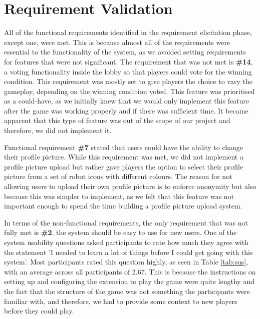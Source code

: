 \documentclass{l4proj}
\begin{document}
\section{Requirement Validation}
All of the functional requirements identified in the requirement elicitation phase, except one, were met. This is because almost all of the requirements were essential to the functionality of the system, as we avoided setting requirements for features that were not significant. The requirement that was not met is \textbf{\#14}, a voting functionality inside the lobby so that players could vote for the winning condition. This requirement was mostly set to give players the choice to vary the gameplay, depending on the winning condition voted. This feature was prioritised as a could-have, as we initially knew that we would only implement this feature after the game was working properly and if there was sufficient time. It became apparent that this type of feature was out of the scope of our project and therefore, we did not implement it. 

Functional requirement \textbf{\#7} stated that users could have the ability to change their profile picture. While this requirement was met, we did not implement a profile picture upload but rather gave players the option to select their profile picture from a set of robot icons with different colours. The reason for not allowing users to upload their own profile picture is to enforce anonymity but also because this was simpler to implement, as we felt that this feature was not important enough to spend the time building a profile picture upload system.

In terms of the non-functional requirements, the only requirement that was not fully met is \textbf{\#2}, the system should be easy to use for new users. One of the system usability questions asked participants to rate how much they agree with the statement 'I needed to learn a lot of things before I could get going with this system'. Most participants rated this question highly, as seen in Table \ref{tab:sus}, with an average across all participants of 2.67. This is because the instructions on setting up and configuring the extension to play the game were quite lengthy and the fact that the structure of the game was not something the participants were familiar with, and therefore, we had to provide some context to new players before they could play.  


\end{document}
